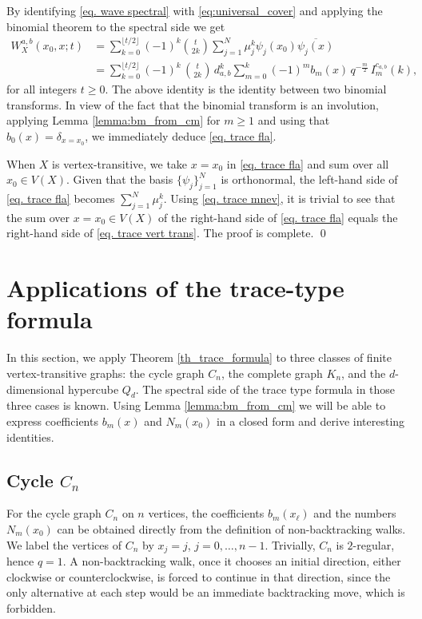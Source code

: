 \documentclass[reqno,10pt]{amsart}
\theoremstyle{definition}
\numberwithin{equation}{section}
\begin{document}
By identifying \eqref{eq. wave spectral} with \eqref{eq:universal_cover} and applying the binomial theorem to the spectral side we get 
\begin{equation*}\label{trace_identity}
\begin{split}
    W_X^{a,b}(x_0,x;t)&=\sum_{k=0}^{\lfloor t/2\rfloor}
(-1)^k\binom{t}{2k}
\sum_{j=1}^{N}
\mu_j^k
\psi_j(x_0)\overline{\psi_j(x)}\\&=
    \sum_{k=0}^{\lfloor t/2 \rfloor}
    (-1)^{k} \,\binom{t}{2k} \, d_{a,b}^k
    \sum_{m=0}^{k} (-1)^{m} b_m(x) \, q^{-\tfrac{m}{2}} \, I_{m}^{c_{a,b}}(k),
\end{split}
\end{equation*}
for all integers $t\geq 0$. The above identity is the identity between two binomial transforms. In view of the fact that the binomial transform is an involution, applying Lemma \ref{lemma:bm_from_cm} for $m\geq 1$ and using that $b_0(x)=\delta_{x=x_0}$, we immediately deduce \eqref{eq. trace fla}. 

\medskip

When $X$ is vertex-transitive, we take $x = x_0$ in \eqref{eq. trace fla} and sum over all $x_0\in V(X)$. Given that the basis $\{\psi_j\}_{j=1}^N$ is orthonormal, the left-hand side of \eqref{eq. trace fla} becomes $\sum_{j=1}^N \mu_j^k$. Using \eqref{eq. trace mnev}, it is trivial to see that the sum over $x=x_0\in V(X)$ of the right-hand side of \eqref{eq. trace fla} equals the right-hand side of \eqref{eq. trace vert trans}. The proof is complete. \qed

\section{Applications of the trace-type formula}

In this section, we apply Theorem \ref{th_trace_formula} to three classes of finite vertex-transitive graphs: the cycle graph $C_n$, the complete graph $K_n$, and the $d$-dimensional hypercube $Q_d$. The spectral side of the trace type formula in those three cases is known. Using Lemma  \ref{lemma:bm_from_cm} we will be able to express coefficients $b_m(x)$ and $N_m(x_0)$ in a closed form and derive interesting identities.

\subsection{Cycle $C_n$}

For the cycle graph $C_n$ on $n$ vertices, the coefficients $b_m(x_\ell)$ and the numbers $N_m(x_0)$ can be obtained directly from the definition of non-backtracking walks. We label the vertices of $C_n$ by $x_j=j$, $
j=0,\ldots, n-1$. Trivially, $C_n$ is $2$-regular, hence $q=1$. A non-backtracking walk, once it chooses an initial direction, either clockwise or counterclockwise, is forced to continue in that direction, since the only alternative at each step would be an immediate backtracking move, which is forbidden.
\end{document}

